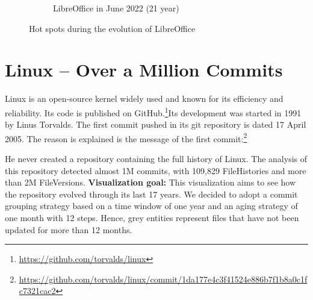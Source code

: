 \begin{figure}[ht]
\begin{subfigure}{0.48\textwidth}
        \caption{LibreOffice in June 2022 (21 year)} 
        \label{fig:Libre_V6_S6}
    \end{subfigure}
    
    \caption{Hot spots during the evolution of LibreOffice} 
    \label{fig:Libre_V6}
\end{figure}


\clearpage
\section{Linux – Over a Million Commits}
Linux is an open-source kernel widely used and known for its efficiency and reliability. Its code is published on GitHub.\footnote{\url{https://github.com/torvalds/linux}}Its development was started in 1991 by Linus Torvalds. The first commit pushed in its git repository is dated 17 April 2005. The reason is explained is the message of the first commit:\footnote{\url{https://github.com/torvalds/linux/commit/1da177e4c3f41524e886b7f1b8a0c1fc7321cac2}}
\begin{displayquote}
\end{displayquote}
He never created a repository containing the full history of Linux. The analysis of this repository detected almost 1M commits, with 109,829 FileHistories and more than 2M FileVersions. 
\bigbreak
\noindent
\textbf{Visualization goal:}
This visualization aims to see how the repository evolved through its last 17 years. We decided to adopt a commit grouping strategy based on a time window of one year and an aging strategy of one month with 12 steps. Hence, grey entities represent files that have not been updated for more than 12 months. 


